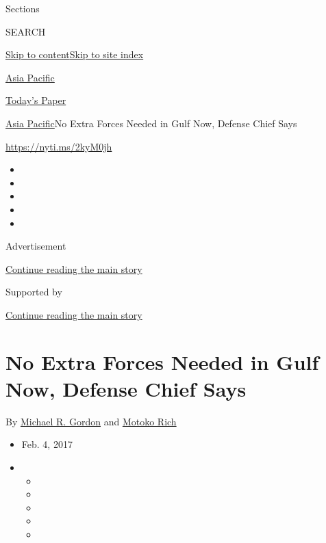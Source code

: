 Sections

SEARCH

\protect\hyperlink{site-content}{Skip to
content}\protect\hyperlink{site-index}{Skip to site index}

\href{https://www.nytimes.com/section/world/asia}{Asia Pacific}

\href{https://myaccount.nytimes.com/auth/login?response_type=cookie\&client_id=vi}{}

\href{https://www.nytimes.com/section/todayspaper}{Today's Paper}

\href{/section/world/asia}{Asia Pacific}\textbar{}No Extra Forces Needed
in Gulf Now, Defense Chief Says

\url{https://nyti.ms/2kyM0jh}

\begin{itemize}
\item
\item
\item
\item
\item
\end{itemize}

Advertisement

\protect\hyperlink{after-top}{Continue reading the main story}

Supported by

\protect\hyperlink{after-sponsor}{Continue reading the main story}

\hypertarget{no-extra-forces-needed-in-gulf-now-defense-chief-says}{%
\section{No Extra Forces Needed in Gulf Now, Defense Chief
Says}\label{no-extra-forces-needed-in-gulf-now-defense-chief-says}}

By \href{http://www.nytimes.com/by/michael-r-gordon}{Michael R. Gordon}
and \href{http://www.nytimes.com/by/motoko-rich}{Motoko Rich}

\begin{itemize}
\item
  Feb. 4, 2017
\item
  \begin{itemize}
  \item
  \item
  \item
  \item
  \item
  \end{itemize}
\end{itemize}

